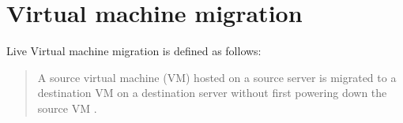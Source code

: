 %
%
%
%
%
%
%


\section{Virtual machine migration}


Live Virtual machine migration is defined as follows:
\begin{quote}
A source virtual machine (VM) hosted on a source server is
migrated to a destination VM on a destination server without
first powering down the source VM \cite{nelson2009virtual}.
\end{quote}

